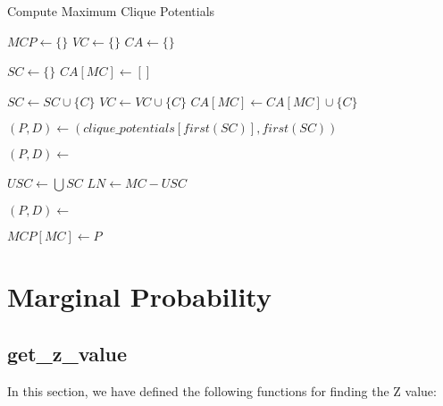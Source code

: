 \documentclass[12pt]{article}
\begin{document}
\begin{algorithm}
    \caption{Compute Maximum Clique Potentials}
    \begin{algorithmic}[1]
    \State $MCP \gets \{\}$ 
    \State $VC \gets \{\}$ 
    \State $CA \gets \{\}$ 
    
        \State $SC \gets \{\}$ 
        \State $CA[MC] \gets []$
        
                \State $SC \gets SC \cup \{C\}$
                \State $VC \gets VC \cup \{C\}$
                \State $CA[MC] \gets CA[MC] \cup \{C\}$
            \EndIf
        \EndFor
        
        \State $(P, D) \gets (clique\_potentials[first(SC)], first(SC))$
        
            \State $(P, D) \gets$ 
        \EndFor
        
        \State $USC \gets \bigcup SC$ 
        \State $LN \gets MC - USC$ 
        
            \State $(P, D) \gets$ 
        \EndFor
    
        \State $MCP[MC] \gets P$
    \EndFor
    \end{algorithmic}
\end{algorithm}
    
\newpage

\section{Marginal Probability}

\subsection{get\_z\_value}
In this section, we have defined the following functions for finding the Z value:
\end{document}
